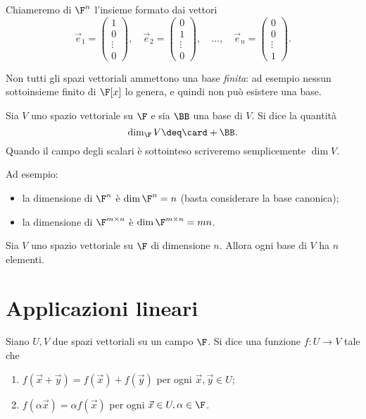 Chiameremo  di $\F^n$ l'insieme formato dai vettori \[
    \vec e_1 = \begin{pmatrix} 1\\0\\\vdots\\0 \end{pmatrix}, \quad
    \vec e_2 = \begin{pmatrix} 0\\1\\\vdots\\0 \end{pmatrix}, \quad
    \dots,                                                    \quad
    \vec e_n = \begin{pmatrix} 0\\0\\\vdots\\1 \end{pmatrix}.
\]

Non tutti gli spazi vettoriali ammettono una base \emph{finita}: ad esempio nessun sottoinsieme finito di $\F[x]$ lo genera, e quindi non può esistere una base. 

\begin{definition}
    Sia $V$ uno spazio vettoriale su $\F$ e sia $\BB$ una base di $V$. Si dice  la quantità \[
        \dim_{\F} V \deq \card+{\BB}.
    \] Quando il campo degli scalari è sottointeso scriveremo semplicemente $\dim V$.
\end{definition}

Ad esempio: \begin{itemize}
    \item la dimensione di $\F^n$ è $\dim \F^n = n$ (basta considerare la base canonica);
    \item la dimensione di $\Mat{\F, m, n}$ è $\dim \Mat{\F, m, n} = mn$.   
\end{itemize}

\begin{theorem}
    Sia $V$ uno spazio vettoriale su $\F$ di dimensione $n$. Allora ogni base di $V$ ha $n$ elementi.
\end{theorem}

\section{Applicazioni lineari}

\begin{definition}
    Siano $U, V$ due spazi vettoriali su un campo $\F$. Si dice  una funzione $f : U \to V$ tale che \begin{enumerate}
        \item $f(\vec x + \vec y) = f(\vec x) + f(\vec y)$ per ogni $\vec x, \vec y \in U$;
        \item $f(\alpha\vec x) = \alpha f(\vec x)$ per ogni $\vec x \in U, \alpha \in \F$.    
    \end{enumerate} 
\end{definition}

